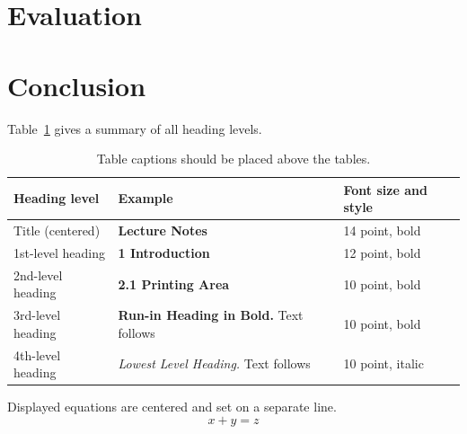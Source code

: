 \documentclass[runningheads]{llncs}
\begin{document}
\section{Evaluation}
\section{Conclusion}


Table~\ref{tab1} gives a summary of all heading levels.

\begin{table}
\caption{Table captions should be placed above the
tables.}\label{tab1}
\begin{tabular}{|l|l|l|}
\hline
Heading level &  Example & Font size and style\\
\hline
Title (centered) &  {\Large\bfseries Lecture Notes} & 14 point, bold\\
1st-level heading &  {\large\bfseries 1 Introduction} & 12 point, bold\\
2nd-level heading & {\bfseries 2.1 Printing Area} & 10 point, bold\\
3rd-level heading & {\bfseries Run-in Heading in Bold.} Text follows & 10 point, bold\\
4th-level heading & {\itshape Lowest Level Heading.} Text follows & 10 point, italic\\
\hline
\end{tabular}
\end{table}


\noindent Displayed equations are centered and set on a separate
line.
\begin{equation}
x + y = z
\end{equation}
\end{document}
